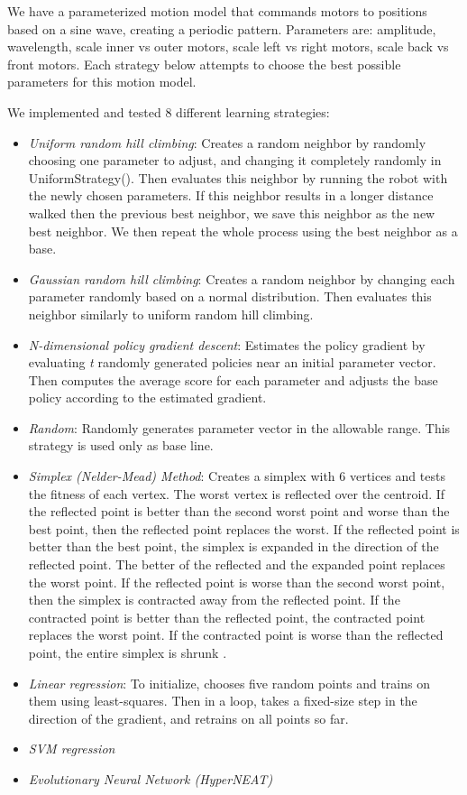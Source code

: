 We have a parameterized motion model that commands motors to positions
based on a sine wave, creating a periodic pattern. Parameters are: 
amplitude, wavelength, scale inner vs outer motors, scale left vs right 
motors, scale back vs front motors. Each strategy below attempts to choose
the best possible parameters for this motion model. 

We implemented and tested 8 different learning strategies:
\begin{itemize}
\item \emph{Uniform random hill climbing}: Creates a random neighbor by
  randomly choosing one parameter to adjust, and changing it completely 
  randomly in UniformStrategy(). Then evaluates this neighbor by running 
  the robot with the newly chosen parameters. If this neighbor results in a
  longer distance walked then the previous best neighbor, we save this
  neighbor as the new best neighbor. We then repeat the whole process
  using the best neighbor as a base.
\item \emph{Gaussian random hill climbing}: Creates a random neighbor by
  changing each parameter randomly based on a normal distribution. Then
  evaluates this neighbor similarly to uniform random hill climbing.
\item \emph{N-dimensional policy gradient descent}: Estimates the policy
  gradient by evaluating \emph{t} randomly generated policies
  near an initial parameter vector. Then computes the average score for
  each parameter and adjusts the base policy according to the estimated
  gradient.
\item \emph{Random}: Randomly generates parameter vector in the allowable
  range. This strategy is used only as base line.
\item \emph{Simplex (Nelder-Mead) Method}: Creates a simplex with 6 vertices and tests the fitness of each vertex. The worst vertex is reflected over the centroid. If the reflected point is better than the second worst point and worse than the best point, then the reflected point replaces the worst. If the reflected point is better than the best point, the simplex is expanded in the direction of the reflected point. The better of the reflected and the expanded point replaces the worst point. If the reflected point is worse than the second worst point, then the simplex is contracted away from the reflected point. If the contracted point is better than the reflected point, the contracted point replaces the worst point. If the contracted point is worse than the reflected point, the entire simplex is shrunk \cite{NMWebsite}.
\item \emph{Linear regression}: To initialize, chooses five random points
and trains on them using least-squares. Then in a loop, takes a fixed-size
step in the direction of the gradient, and retrains on all points so far.
\item \emph{SVM regression}
\item \emph{Evolutionary Neural Network (HyperNEAT)\cite{2}}
\end{itemize}

